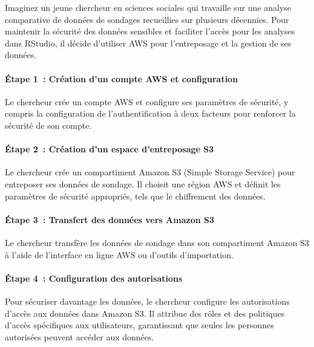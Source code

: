 \documentclass[
  letterpaper,
  DIV=11,
  numbers=noendperiod]{scrreprt}
\let\oldparagraph\paragraph
\renewcommand{\paragraph}[1]{\oldparagraph{#1}\mbox{}}
\begin{document}
Imaginez un jeune chercheur en sciences sociales qui travaille sur une
analyse comparative de données de sondages recueillies sur plusieurs
décennies. Pour maintenir la sécurité des données sensibles et faciliter
l'accès pour les analyses dans RStudio, il décide d'utiliser AWS pour
l'entreposage et la gestion de ses données.

\paragraph{Étape 1~: Création d'un compte AWS et
configuration}\label{uxe9tape-1-cruxe9ation-dun-compte-aws-et-configuration}

Le chercheur crée un compte AWS et configure ses paramètres de sécurité,
y compris la configuration de l'authentification à deux facteurs pour
renforcer la sécurité de son compte.

\paragraph{Étape 2~: Création d'un espace d'entreposage
S3}\label{uxe9tape-2-cruxe9ation-dun-espace-dentreposage-s3}

Le chercheur crée un compartiment Amazon S3 (Simple Storage Service)
pour entreposer ses données de sondage. Il choisit une région AWS et
définit les paramètres de sécurité appropriés, tels que le chiffrement
des données.

\paragraph{Étape 3~: Transfert des données vers Amazon
S3}\label{uxe9tape-3-transfert-des-donnuxe9es-vers-amazon-s3}

Le chercheur transfère les données de sondage dans son compartiment
Amazon S3 à l'aide de l'interface en ligne AWS ou d'outils
d'importation.

\paragraph{Étape 4~: Configuration des
autorisations}\label{uxe9tape-4-configuration-des-autorisations}

Pour sécuriser davantage les données, le chercheur configure les
autorisations d'accès aux données dans Amazon S3. Il attribue des rôles
et des politiques d'accès spécifiques aux utilisateurs, garantissant que
seules les personnes autorisées peuvent accéder aux données.
\end{document}
